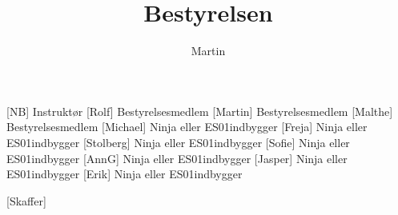 \documentclass[a4paper,11pt]{article}
\title{Bestyrelsen}
\author{Martin}
\begin{document}
\maketitle

\begin{roles}
[NB] Instruktør
[Rolf] Bestyrelsesmedlem
[Martin] Bestyrelsesmedlem
[Malthe] Bestyrelsesmedlem
[Michael] Ninja eller ES01indbygger
[Freja] Ninja eller ES01indbygger
[Stolberg] Ninja eller ES01indbygger
[Sofie] Ninja eller ES01indbygger
[AnnG] Ninja eller ES01indbygger
[Jasper] Ninja eller ES01indbygger
[Erik] Ninja eller ES01indbygger
\end{roles}

\begin{props}
[Skaffer]
\end{props}
\end{document}
